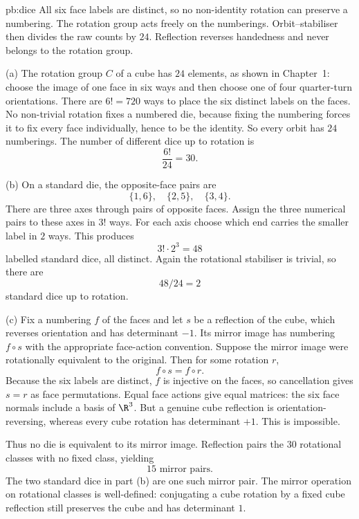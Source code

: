 \begin{solution}{pb:dice}
\idea All six face labels are distinct, so no non-identity rotation can preserve a numbering. The rotation group acts freely on the numberings. Orbit--stabiliser then divides the raw counts by $24$. Reflection reverses handedness and never belongs to the rotation group.

\writeup (a) The rotation group $C$ of a cube has $24$ elements, as shown in Chapter~1: choose the image of one face in six ways and then choose one of four quarter-turn orientations. There are $6!=720$ ways to place the six distinct labels on the faces. No non-trivial rotation fixes a numbered die, because fixing the numbering forces it to fix every face individually, hence to be the identity. So every orbit has $24$ numberings. The number of different dice up to rotation is
\[
\boxed{\frac{6!}{24}=30}.
\]

(b) On a standard die, the opposite-face pairs are
\[
\{1,6\},\quad\{2,5\},\quad\{3,4\}.
\]
There are three axes through pairs of opposite faces. Assign the three numerical pairs to these axes in $3!$ ways. For each axis choose which end carries the smaller label in $2$ ways. This produces
\[
3!\cdot2^3=48
\]
labelled standard dice, all distinct. Again the rotational stabiliser is trivial, so there are
\[
\boxed{48/24=2}
\]
standard dice up to rotation.

(c) Fix a numbering $f$ of the faces and let $s$ be a reflection of the cube, which reverses orientation and has determinant $-1$. Its mirror image has numbering $f\circ s$ with the appropriate face-action convention. Suppose the mirror image were rotationally equivalent to the original. Then for some rotation $r$,
\[
f\circ s=f\circ r.
\]
Because the six labels are distinct, $f$ is injective on the faces, so cancellation gives $s=r$ as face permutations. Equal face actions give equal matrices: the six face normals include a basis of $\R^3$. But a genuine cube reflection is orientation-reversing, whereas every cube rotation has determinant $+1$. This is impossible.

Thus no die is equivalent to its mirror image. Reflection pairs the $30$ rotational classes with no fixed class, yielding
\[
\boxed{15\text{ mirror pairs}}.
\]
The two standard dice in part (b) are one such mirror pair. The mirror operation on rotational classes is well-defined: conjugating a cube rotation by a fixed cube reflection still preserves the cube and has determinant $1$.
\end{solution}

